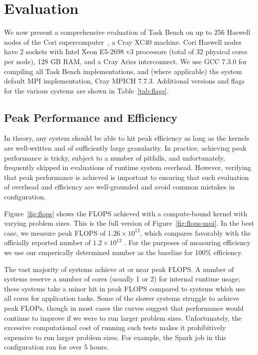 \section{Evaluation}
\label{sec:evaluation}



We now present a comprehensive evaluation of Task Bench on up to 256
Haswell nodes of the Cori supercomputer~\cite{Cori}, a Cray XC40
machine. Cori Haswell nodes have 2 sockets with Intel Xeon E5-2698 v3
processors (total of 32 physical cores per node), 128 GB RAM, and a
Cray Aries interconnect. We use GCC 7.3.0 for compiling all Task Bench
implementations, and (where applicable) the system default MPI
implementation, Cray MPICH 7.7.3. Additional versions and flags for the
various systems are shown in Table~\ref{tab:flags}.

\subsection{Peak Performance and Efficiency}




In theory, any system should be able to hit peak efficiency as long as
the kernels are well-written and of sufficiently large granularity. In
practice, achieving peak performance is tricky, subject to a number of
pitfalls, and unfortunately, frequently skipped in evaluations of
runtime system overhead. However, verifying that peak performance is
achieved is important to ensuring that such evaluation of overhead and
efficiency are well-grounded and avoid common mistakes in
configuration.

Figure~\ref{fig:flops} shows the FLOPS achieved with a compute-bound
kernel with varying problem sizes. This is the full version of
Figure~\ref{fig:flops-mpi}. In the best case, we measure peak FLOPS of
$1.26 \times 10^{12}$, which compares favorably with the officially
reported number of $1.2 \times 10^{12}$ \cite{Cori}. For the purposes
of measuring efficiency we use our emperically determined number as
the baseline for 100\% efficiency.

The vast majority of systems achieve at or near peak FLOPS. A number
of systems reserve a number of cores (usually 1 or 2) for internal
runtime usage; these systems take a minor hit in peak FLOPS compared
to systems which use all cores for application tasks. Some of the
slower systems struggle to achieve peak FLOPs, though in most cases
the curves suggest that performance would continue to improve if we
were to run larger problem sizes. Unfortunately, the excessive
computational cost of running such tests makes it prohibitively
expensive to run larger problem sizes. For example, the Spark job in
this configuration ran for over 5 hours.

